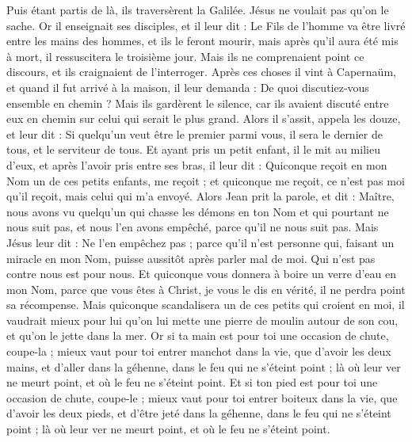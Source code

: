 \begin{multicols}{2}
Puis étant partis de là, ils traversèrent la Galilée. Jésus ne voulait pas qu'on le sache.
Or il enseignait ses disciples, et il leur dit : Le Fils de l'homme va être livré entre les mains des hommes, et ils le feront mourir, mais après qu'il aura été mis à mort, il ressuscitera le troisième jour.
Mais ils ne comprenaient point ce discours, et ils craignaient de l'interroger.
Après ces choses il vint à Capernaüm, et quand il fut arrivé à la maison, il leur demanda : De quoi discutiez-vous ensemble en chemin ?
Mais ils gardèrent le silence, car ils avaient discuté entre eux en chemin sur celui qui serait le plus grand.
Alors il s'assit, appela les douze, et leur dit : Si quelqu'un veut être le premier parmi vous, il sera le dernier de tous, et le serviteur de tous.
Et ayant pris un petit enfant, il le mit au milieu d'eux, et après l'avoir pris entre ses bras, il leur dit :
Quiconque reçoit en mon Nom un de ces petits enfants, me reçoit ; et quiconque me reçoit, ce n'est pas moi qu'il reçoit, mais celui qui m'a envoyé.
Alors Jean prit la parole, et dit : Maître, nous avons vu quelqu'un qui chasse les démons en ton Nom et qui pourtant ne nous suit pas, et nous l'en avons empêché, parce qu'il ne nous suit pas.
Mais Jésus leur dit : Ne l'en empêchez pas ; parce qu'il n'est personne qui, faisant un miracle en mon Nom, puisse aussitôt après parler mal de moi.
Qui n'est pas contre nous est pour nous.
Et quiconque vous donnera à boire un verre d'eau en mon Nom, parce que vous êtes à Christ, je vous le dis en vérité, il ne perdra point sa récompense.
Mais quiconque scandalisera un de ces petits qui croient en moi, il vaudrait mieux pour lui qu'on lui mette une pierre de moulin autour de son cou, et qu'on le jette dans la mer.
Or si ta main est pour toi une occasion de chute, coupe-la ; mieux vaut pour toi entrer manchot dans la vie, que d'avoir les deux mains, et d'aller dans la géhenne, dans le feu qui ne s'éteint point ;
là où leur ver ne meurt point, et où le feu ne s'éteint point.
Et si ton pied est pour toi une occasion de chute, coupe-le ; mieux vaut pour toi entrer boiteux dans la vie, que d'avoir les deux pieds, et d'être jeté dans la géhenne, dans le feu qui ne s'éteint point ;
là où leur ver ne meurt point, et où le feu ne s'éteint point.

\end{multicols}

